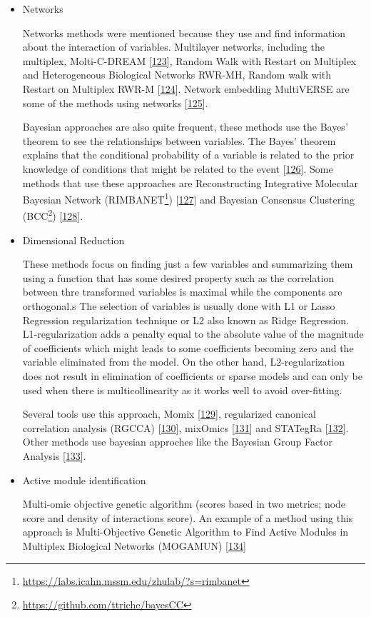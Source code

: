 \documentclass[
  12pt,
  a4paper,
  twoside,
  openright]{book}
\DeclareRobustCommand{\href}[2]{#2\footnote{\url{#1}}}
\begin{document}
\begin{itemize}
\item
  Networks

  Networks methods were mentioned because they use and find information about the interaction of variables.
  Multilayer networks, including the multiplex, Molti-C-DREAM {[}\protect\hyperlink{ref-didier2018}{123}{]}, Random Walk with Restart on Multiplex and Heterogeneous Biological Networks RWR-MH, Random walk with Restart on Multiplex RWR-M {[}\protect\hyperlink{ref-valdeolivas2019}{124}{]}.
  Network embedding MultiVERSE are some of the methods using networks {[}\protect\hyperlink{ref-pio-lopez2021}{125}{]}.

  Bayesian approaches are also quite frequent, these methods use the Bayes' theorem to see the relationships between variables.
  The Bayes' theorem explains that the conditional probability of a variable is related to the prior knowledge of conditions that might be related to the event {[}\protect\hyperlink{ref-bayes1763}{126}{]}.
  Some methods that use these approaches are Reconstructing Integrative Molecular Bayesian Network (\href{https://labs.icahn.mssm.edu/zhulab/?s=rimbanet}{RIMBANET}) {[}\protect\hyperlink{ref-zhu2012}{127}{]} and Bayesian Consensus Clustering (\href{https://github.com/ttriche/bayesCC}{BCC}) {[}\protect\hyperlink{ref-lock2013}{128}{]}.
\item
  Dimensional Reduction

  These methods focus on finding just a few variables and summarizing them using a function that has some desired property such as the correlation between thre transformed variables is maximal while the components are orthogonal.s The selection of variables is usually done with L1 or Lasso Regression regularization technique or L2 also known as Ridge Regression.
  L1-regularization adds a penalty equal to the absolute value of the magnitude of coefficients which might leads to some coefficients becoming zero and the variable eliminated from the model.
  On the other hand, L2-regularization does not result in elimination of coefficients or sparse models and can only be used when there is multicollinearity as it works well to avoid over-fitting.

  Several tools use this approach, Momix {[}\protect\hyperlink{ref-cantini2021}{129}{]}, regularized canonical correlation analysis (RGCCA) {[}\protect\hyperlink{ref-tenenhaus2017}{130}{]}, mixOmics {[}\protect\hyperlink{ref-rohart2017}{131}{]} and STATegRa {[}\protect\hyperlink{ref-gomez-cabrero2019}{132}{]}.
  Other methods use bayesian approches like the Bayesian Group Factor Analysis {[}\protect\hyperlink{ref-virtanen2012}{133}{]}.
\item
  Active module identification

  Multi-omic objective genetic algorithm (scores based in two metrics; node score and density of interactions score).
  An example of a method using this approach is Multi-Objective Genetic Algorithm to Find Active Modules in Multiplex Biological Networks (MOGAMUN) {[}\protect\hyperlink{ref-novoa-del-toro2020}{134}{]}
\end{itemize}
\end{document}
